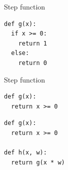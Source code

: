 \begin{frame}[fragile]
  \begin{block}{Step function}
      \begin{lstlisting}
def g(x):
  if x >= 0:
    return 1
  else:
    return 0
      \end{lstlisting}
  \end{block}
\end{frame}


\begin{frame}[fragile]
  \begin{block}{Step function}
      \begin{lstlisting}
def g(x):
  return x >= 0
      \end{lstlisting}
  \end{block}
\end{frame}

\begin{frame}[fragile]
  \begin{block}{}
      \begin{lstlisting}
def g(x):
  return x >= 0

def h(x, w):
  return g(x * w)
      \end{lstlisting}
  \end{block}
\end{frame}
